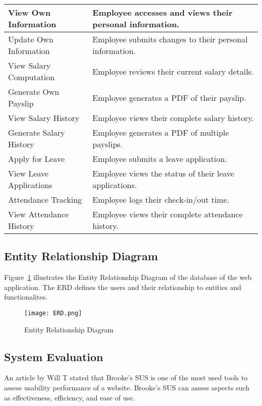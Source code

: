 \documentclass{icsthesis}
\begin{document}
\begin{mainmatter}
\begin{longtable}{|p{}|p{}|}
\hline
\endlastfoot

View Own Information & Employee accesses and views their personal information. \\
\hline
Update Own Information & Employee submits changes to their personal information. \\
\hline
View Salary Computation & Employee reviews their current salary details. \\
\hline
Generate Own Payslip & Employee generates a PDF of their payslip. \\
\hline
View Salary History & Employee views their complete salary history. \\
\hline
Generate Salary History & Employee generates a PDF of multiple payslips. \\
\hline
Apply for Leave & Employee submits a leave application. \\
\hline
View Leave Applications & Employee views the status of their leave applications. \\
\hline
Attendance Tracking & Employee logs their check-in/out time. \\
\hline
View Attendance History & Employee views their complete attendance history. \\
\end{longtable}

\subsection{\textbf{Entity Relationship Diagram}}

Figure~\ref{fig:erd} illustrates the Entity Relationship Diagram of the database of the web application. The ERD defines the users and their relationship to entities and functionalites.

\begin{figure}[htbp]
    \centering
    \texttt{[image: ERD.png]}
    \caption{Entity Relationship Diagram}
    \label{fig:erd}
\end{figure}
\subsection{\textbf{System Evaluation}}

An article by Will T stated that Brooke’s SUS is one of the most used tools to assess usability performance of a website. Brooke’s SUS can assess aspects such as effectiveness, efficiency, and ease of use.


\end{mainmatter}
\end{document}
